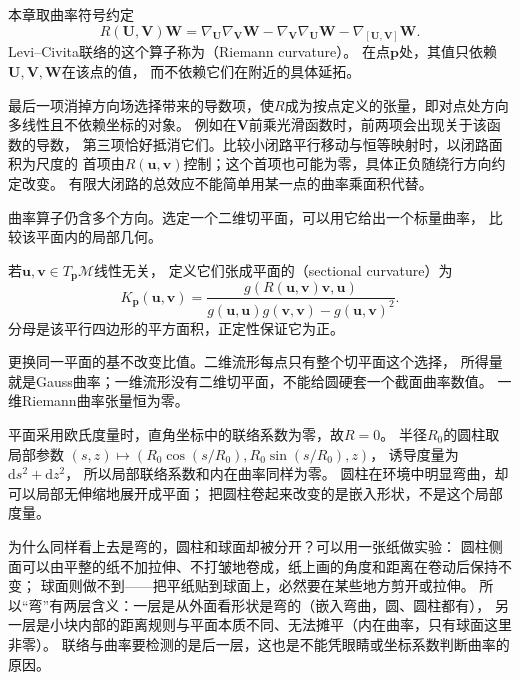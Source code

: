 \begin{definition}[Riemann曲率]
\label{def:geometry-riemann-curvature}
本章取曲率符号约定
\begin{equation}
 R(\bm U,\bm V)\bm W
 =\nabla_{\bm U}\nabla_{\bm V}\bm W
  -\nabla_{\bm V}\nabla_{\bm U}\bm W
  -\nabla_{[\bm U,\bm V]}\bm W.
 \label{eq:geometry-riemann-curvature}
\end{equation}
Levi--Civita联络的这个算子称为（Riemann curvature）。
在点$\bm p$处，其值只依赖$\bm U,\bm V,\bm W$在该点的值，
而不依赖它们在附近的具体延拓。
\end{definition}
最后一项消掉方向场选择带来的导数项，使$R$成为按点定义的张量，即对点处方向多线性且不依赖坐标的对象。
例如在$\bm V$前乘光滑函数时，前两项会出现关于该函数的导数，
第三项恰好抵消它们。比较小闭路平行移动与恒等映射时，以闭路面积为尺度的
首项由$R(\bm u,\bm v)$控制；这个首项也可能为零，具体正负随绕行方向约定改变。
有限大闭路的总效应不能简单用某一点的曲率乘面积代替。

曲率算子仍含多个方向。选定一个二维切平面，可以用它给出一个标量曲率，
比较该平面内的局部几何。
\begin{definition}[截面曲率]
\label{def:geometry-sectional-curvature}
若$\bm u,\bm v\in T_{\bm p}\mathcal M$线性无关，
定义它们张成平面的（sectional curvature）为
\begin{equation}
 K_{\bm p}(\bm u,\bm v)
 =\frac{g(R(\bm u,\bm v)\bm v,\bm u)}
 {g(\bm u,\bm u)g(\bm v,\bm v)-g(\bm u,\bm v)^2}.
 \label{eq:geometry-sectional-curvature}
\end{equation}
分母是该平行四边形的平方面积，正定性保证它为正。
\end{definition}
更换同一平面的基不改变比值。二维流形每点只有整个切平面这个选择，
所得量就是Gauss曲率；一维流形没有二维切平面，不能给圆硬套一个截面曲率数值。
一维Riemann曲率张量恒为零。

平面采用欧氏度量时，直角坐标中的联络系数为零，故$R=0$。
半径$R_0$的圆柱取局部参数
$(s,z)\mapsto(R_0\cos(s/R_0),R_0\sin(s/R_0),z)$，
诱导度量为$\mathrm ds^2+\mathrm dz^2$，
所以局部联络系数和内在曲率同样为零。
圆柱在环境中明显弯曲，却可以局部无伸缩地展开成平面；
把圆柱卷起来改变的是嵌入形状，不是这个局部度量。

为什么同样看上去是弯的，圆柱和球面却被分开？可以用一张纸做实验：
圆柱侧面可以由平整的纸不加拉伸、不打皱地卷成，纸上画的角度和距离在卷动后保持不变；
球面则做不到——把平纸贴到球面上，必然要在某些地方剪开或拉伸。
所以“弯”有两层含义：一层是从外面看形状是弯的（嵌入弯曲，圆、圆柱都有），
另一层是小块内部的距离规则与平面本质不同、无法摊平（内在曲率，只有球面这里非零）。
联络与曲率要检测的是后一层，这也是不能凭眼睛或坐标系数判断曲率的原因。

